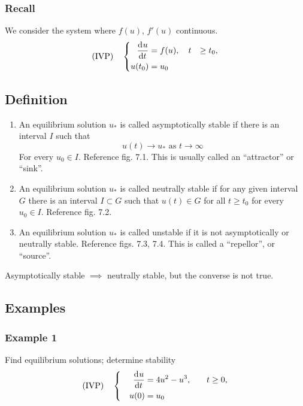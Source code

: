 \documentclass[12pt]{article}
\begin{document}
\subsubsection*{Recall}
We consider the system where $f(u)$, $f'(u)$ continuous.
\begin{equation} \text{(IVP)} \quad
  \left\{
  \begin{aligned}
    \frac{\mathrm{d}^{} {u}}{\mathrm{d}{t}^{}}&=f(u),\quad t&\ge t_0, \\
    u(t_0) &= u_0 \\
  \end{aligned} \right.
\end{equation}

\subsection{Definition}
\begin{enumerate}
\item An equilibrium solution $u_*$ is called asymptotically stable if there is
  an interval $I$ such that
  \begin{equation}
    u(t) \rightarrow u_* \text{ as } t\rightarrow\infty
  \end{equation}
  For every $u_0\in I$. Reference fig. 7.1. This is usually called an
  ``attractor'' or ``sink''.
\item An equilibrium solution $u_*$ is called neutrally stable if for any given
  interval $G$ there is an interval $I \subset G$ such that $u(t) \in G$ for all
  $t\ge t_0$ for every $u_0\in I$. Reference fig. 7.2.
\item An equilibrium solution $u_*$ is called unstable if it is not
  asymptotically or neutrally stable. Reference figs. 7.3, 7.4. This is called a
  ``repellor'', or ``source''.
\end{enumerate}

Asymptotically stable $\implies$ neutrally stable, but the converse is not true.

\subsection{Examples}
\subsubsection*{Example 1}
Find equilibrium solutions; determine stability
\begin{equation} \text{(IVP)}\quad
  \left\{
  \begin{aligned}
    \frac{\mathrm{d}^{} {u}}{\mathrm{d}{t}^{}} &= 4u^2-u^3,&\quad t&\ge0, \\ \quad u(0)&=u_0 \\
  \end{aligned} \right.
\end{equation}
\end{document}
